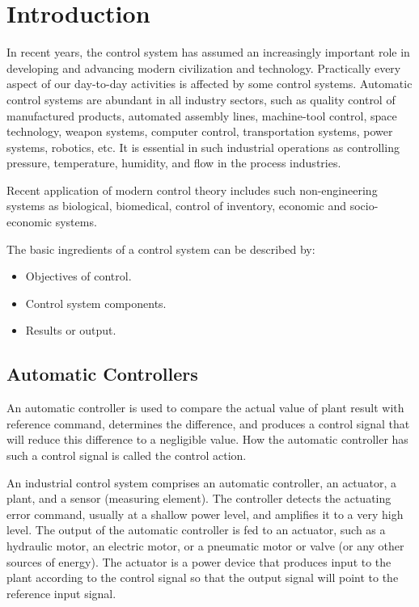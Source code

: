 \chapter{\label{intro}Introduction}


In recent years, the control system has assumed an increasingly important role in developing and advancing modern civilization and technology. Practically every aspect of our day-to-day activities is affected by some control systems. Automatic control systems are abundant in all industry sectors, such as quality control of manufactured products, automated assembly lines, machine-tool control, space technology, weapon systems, computer control, transportation systems, power systems, robotics, etc. It is essential in such industrial operations as controlling pressure, temperature, humidity, and flow in the process 
industries. 
 
Recent application of modern control theory includes such non-engineering systems 
as biological, biomedical, control of inventory, economic and socio-economic systems. 
 
The basic ingredients of a control system can be described by:
\begin{itemize}
	\item Objectives of control. 
	\item Control system components. 
	\item Results or output. 
\end{itemize} 


\section{Automatic Controllers}

An automatic controller is used to compare the actual value of plant result with reference command, determines the difference, and produces a control signal that will reduce this difference to a negligible value. How the automatic controller has such a control signal is called the control action. 
 
An industrial control system comprises an automatic controller, an actuator, a plant, and a sensor (measuring element). The controller detects the actuating error command, usually at a shallow power level, and amplifies it to a very high level. The output of the automatic controller is fed to an actuator, such as a hydraulic motor, an electric motor, or a pneumatic motor or valve (or any other sources of energy). The actuator is a power device that produces input to the plant according to the control signal so that the output signal will point to the reference input signal. 
 
